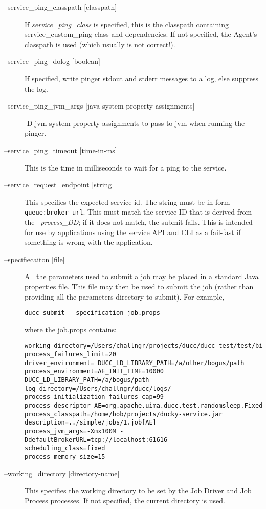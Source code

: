 \begin{description}
      \item[--service\_ping\_classpath {[classpath]}] If {\em service\_ping\_class} is specified,
        this is the classpath containing service\_custom\_ping class and dependencies.  If not
        specified, the Agent's classpath is used (which usually is not correct!).

      \item[--service\_ping\_dolog {[boolean]}] If specified, write pinger stdout and stderr
        messages to a log, else suppress the log.

      \item[--service\_ping\_jvm\_args {[java-system-property-assignments]}] -D jvm system property
        assignments to pass to jvm when running the pinger.

      \item[--service\_ping\_timeout {[time-in-ms]}] This is the time in milliseconds to wait for a ping to the
        service. 

      \item[--service\_request\_endpoint {[string]}] This specifies the expected service id.  The string
        must be in form {\tt queue:broker-url}.  This must match the service ID that is derived from
        the {\em --process\_DD}; if it does not match, the submit fails.  This is intended for use
        by applications using the service API and CLI as a fail-fast if something is wrong with the
        application.

      \item[--specifiecaiton {[file]}] All the parameters used to submit a job may be placed in a
        standard Java properties file.  This file may then be used to submit the job (rather than
        providing all the parameters directory to submit).
        For example, 

\begin{verbatim}
ducc_submit --specification job.props 
\end{verbatim}
        
        where the job.props contains: 

\begin{verbatim}
working_directory=/Users/challngr/projects/ducc/ducc_test/test/bin 
process_failures_limit=20 
driver_environment= DUCC_LD_LIBRARY_PATH=/a/other/bogus/path 
process_environment=AE_INIT_TIME=10000 DUCC_LD_LIBRARY_PATH=/a/bogus/path 
log_directory=/Users/challngr/ducc/logs/ 
process_initialization_failures_cap=99 
process_descriptor_AE=org.apache.uima.ducc.test.randomsleep.FixedSleepAE 
process_classpath=/home/bob/projects/ducky-service.jar 
description=../simple/jobs/1.job[AE] 
process_jvm_args=-Xmx100M -DdefaultBrokerURL=tcp://localhost:61616 
scheduling_class=fixed 
process_memory_size=15 
\end{verbatim}
        
        \item[--working\_directory {[directory-name]}]
          This specifies the working directory to be set by the Job Driver and Job Process processes. 
          If not specified, the current directory is used.
    \end{description}
        

